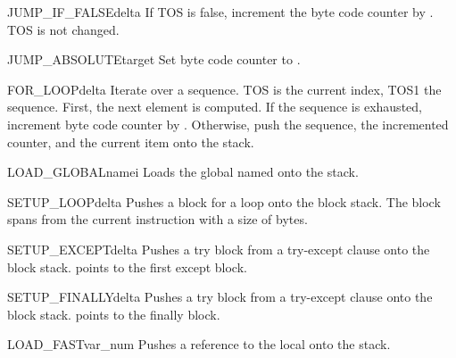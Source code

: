 \begin{opcodedesc}{JUMP_IF_FALSE}{delta}
If TOS is false, increment the byte code counter by .  TOS
is not changed. 
\end{opcodedesc}

\begin{opcodedesc}{JUMP_ABSOLUTE}{target}
Set byte code counter to .
\end{opcodedesc}

\begin{opcodedesc}{FOR_LOOP}{delta}
Iterate over a sequence.  TOS is the current index, TOS1 the sequence.
First, the next element is computed.  If the sequence is exhausted,
increment byte code counter by .  Otherwise, push the
sequence, the incremented counter, and the current item onto the stack.
\end{opcodedesc}


\begin{opcodedesc}{LOAD_GLOBAL}{namei}
Loads the global named  onto the stack.
\end{opcodedesc}


\begin{opcodedesc}{SETUP_LOOP}{delta}
Pushes a block for a loop onto the block stack.  The block spans
from the current instruction with a size of  bytes.
\end{opcodedesc}

\begin{opcodedesc}{SETUP_EXCEPT}{delta}
Pushes a try block from a try-except clause onto the block stack.
 points to the first except block.
\end{opcodedesc}

\begin{opcodedesc}{SETUP_FINALLY}{delta}
Pushes a try block from a try-except clause onto the block stack.
 points to the finally block.
\end{opcodedesc}

\begin{opcodedesc}{LOAD_FAST}{var_num}
Pushes a reference to the local  onto
the stack.
\end{opcodedesc}

